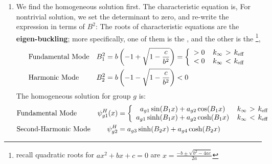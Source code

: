 \documentclass{school-22.211-notes}
\begin{document}
\begin{enumerate}
\begin{enumerate}
\item We find the homogeneous solution first. The characteristic equation is, 
    For nontrivial solution, we set the determinant to zero, and re-write the expression in terms of $B^2$: 
    The roots of characteristic equations are the \textbf{eigen-buckling}; more specifically, one of them is the , and the other is the \footnote{recall quadratic roots for $ax^2 + bx + c = 0$ are $x = \frac{-b \pm \sqrt{b^2 - 4ac}}{2a}$}, 
    \begin{align}
      &\mbox{Fundamental Mode} &B_1^2&= b\left(-1 + \sqrt{1 - \frac{c}{b^2}} \right) = \left\{ \begin{array}{cc} > 0 & \left. k_{\infty} \right. > \left. k_{\mathrm{eff}} \right. \\ < 0 & \left. k_{\infty} \right. < \left. k_{\mathrm{eff}} \right. \end{array} \right. \\
      &\mbox{Harmonic Mode} &B_2^2&=b\left(-1 - \sqrt{1 - \frac{c}{b^2}} \right) <0
    \end{align}
    The homogeneous solution for group $g$ is: 
     \begin{align}
      &\mbox{Fundamental Mode} &\psi_{g1}^H(x)&= \left\{ \begin{array}{cc} a_{g1} \sin(B_1 x) + a_{g2} \cos(B_1x) & \kinf > \keff \\ a_{g1} \sinh(B_1 x) + a_{g2} \cosh(B_1 x) & \kinf < \keff \end{array} \right. \\
      &\mbox{Second-Harmonic Mode} &\psi_{g2}^H&=a_{g3} \sinh(B_2 x) + a_{g4} \cosh(B_2 x) 

\end{align}
\end{enumerate}
\end{enumerate}
\end{document}
